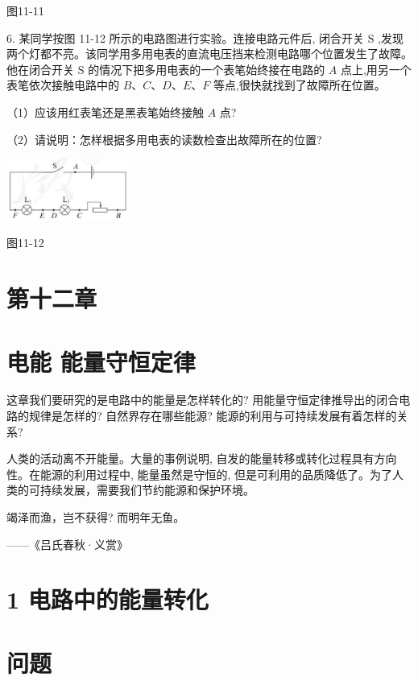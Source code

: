 \documentclass[10pt]{article}
\begin{document}
图11-11

6. 某同学按图 11-12 所示的电路图进行实验。连接电路元件后, 闭合开关 \(\mathrm{S}\) ,发现两个灯都不亮。该同学用多用电表的直流电压挡来检测电路哪个位置发生了故障。他在闭合开关 \(\mathrm{S}\) 的情况下把多用电表的一个表笔始终接在电路的 \(A\) 点上,用另一个表笔依次接触电路中的 \(B\text{、}C\text{、}D\text{、}E\text{、}F\) 等点,很快就找到了故障所在位置。

（1）应该用红表笔还是黑表笔始终接触 \(A\) 点?

（2）请说明：怎样根据多用电表的读数检查出故障所在的位置?

\begin{center}
\includegraphics[max width=0.3\textwidth]{images/01911d5f-8e38-70c0-b5b8-2b399bd115b6_82_997968.jpg}
\end{center}

图11-12

\section*{第十二章}

\section*{电能 能量守恒定律}

这章我们要研究的是电路中的能量是怎样转化的? 用能量守恒定律推导出的闭合电路的规律是怎样的? 自然界存在哪些能源? 能源的利用与可持续发展有着怎样的关系?

人类的活动离不开能量。大量的事例说明, 自发的能量转移或转化过程具有方向性。在能源的利用过程中, 能量虽然是守恒的, 但是可利用的品质降低了。为了人类的可持续发展，需要我们节约能源和保护环境。

竭泽而渔，岂不获得? 而明年无鱼。

——《吕氏春秋·义赏》

\section*{1 电路中的能量转化}

\section*{问题}
\end{document}
